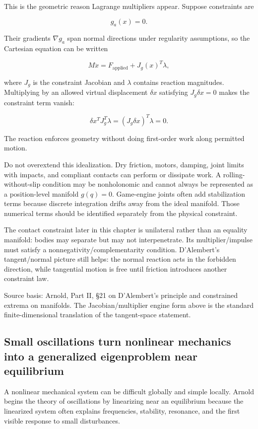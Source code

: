 This is the geometric reason Lagrange multipliers appear. Suppose constraints are

\[
g_a(x)=0.
\]

Their gradients \(\nabla g_a\) span normal directions under regularity assumptions, so the Cartesian equation can be written

\[
M\ddot x
=
F_{\mathrm{applied}}
+
J_g(x)^T\lambda,
\]

where \(J_g\) is the constraint Jacobian and \(\lambda\) contains reaction magnitudes. Multiplying by an allowed virtual displacement \(\delta x\) satisfying \(J_g\delta x=0\) makes the constraint term vanish:

\[
\delta x^T J_g^T\lambda
=
(J_g\delta x)^T\lambda
=
0.
\]

The reaction enforces geometry without doing first-order work along permitted motion.

Do not overextend this idealization. Dry friction, motors, damping, joint limits with impacts, and compliant contacts can perform or dissipate work. A rolling-without-slip condition may be nonholonomic and cannot always be represented as a position-level manifold \(g(q)=0\). Game-engine joints often add stabilization terms because discrete integration drifts away from the ideal manifold. Those numerical terms should be identified separately from the physical constraint.

The contact constraint later in this chapter is unilateral rather than an equality manifold: bodies may separate but may not interpenetrate. Its multiplier/impulse must satisfy a nonnegativity/complementarity condition. D'Alembert's tangent/normal picture still helps: the normal reaction acts in the forbidden direction, while tangential motion is free until friction introduces another constraint law.

Source basis: Arnold, Part II, §21 on D'Alembert's principle and constrained extrema on manifolds. The Jacobian/multiplier engine form above is the standard finite-dimensional translation of the tangent-space statement.

\subsection{Small oscillations turn nonlinear mechanics into a generalized eigenproblem near equilibrium}\label{small-oscillations-turn-nonlinear-mechanics-into-a-generalized-eigenproblem-near-equilibrium}

A nonlinear mechanical system can be difficult globally and simple locally. Arnold begins the theory of oscillations by linearizing near an equilibrium because the linearized system often explains frequencies, stability, resonance, and the first visible response to small disturbances.

